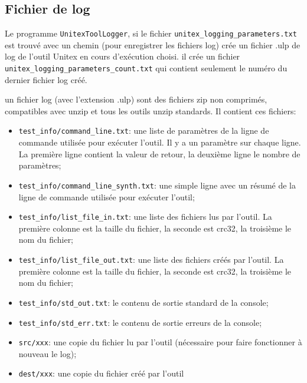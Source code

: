 \subsection{Fichier de log}
 \label{section-log-file}
Le programme \verb+UnitexToolLogger+, si le fichier \verb+unitex_logging_parameters.txt+ 
est trouvé avec un chemin (pour enregistrer les fichiers log) crée un fichier .ulp de log de l'outil 
Unitex en cours d'exécution choisi.
il crée un fichier \verb+unitex_logging_parameters_count.txt+ qui contient seulement le numéro du
dernier fichier log créé.

un fichier log (avec l'extension .ulp) sont des fichiers zip non comprimés, compatibles avec unzip
et tous les outils unzip standards. Il contient ces fichiers:
\begin{itemize}
\item \verb+test_info/command_line.txt+: une liste de paramètres de la ligne de commande utilisée
	pour exécuter l'outil. Il y a un paramètre sur chaque ligne. La première ligne contient la
	valeur de retour, la deuxième ligne le nombre de paramètres;

  \item \verb+test_info/command_line_synth.txt+: une simple ligne avec un résumé de la
ligne de commande utilisée pour exécuter l'outil;

\item \verb+test_info/list_file_in.txt+: une liste des fichiers lus par l'outil.
	La première colonne est la taille du fichier, la seconde est crc32, la troisième le nom du
	fichier;

\item \verb+test_info/list_file_out.txt+: une liste des fichiers créés par l'outil.
  La première colonne est la taille du fichier, la seconde est crc32, la troisième le nom du
  fichier;

  \item \verb+test_info/std_out.txt+: le contenu de sortie standard de la console;

  \item \verb+test_info/std_err.txt+: le contenu de sortie erreurs de la console;

  \item \verb+src/xxx+: une copie du fichier lu par l'outil (nécessaire pour faire fonctionner à
  		  nouveau le log);

  \item \verb+dest/xxx+: une copie du fichier créé par l'outil
\end{itemize}

